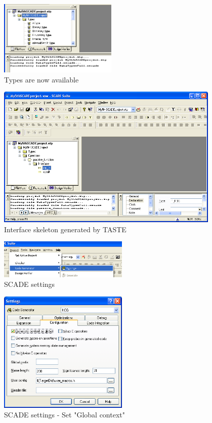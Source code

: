 \documentclass[11pt]{book}
\begin{document}
\begin{figure}
\centering
\includegraphics[width=0.5\textwidth]{imgs/scade5}
\caption{Types are now available}
\label{scade5}
\end{figure}
\begin{figure}
\centering
\includegraphics[width=0.95\textwidth]{imgs/scade6}
\caption{Interface skeleton generated by TASTE}
\label{scade6}
\end{figure}
\begin{figure}
\centering
\includegraphics[width=0.55\textwidth]{imgs/scade7}
\caption{SCADE settings}
\label{scade7}
\end{figure}
\begin{figure}
\centering
\includegraphics[width=0.55\textwidth]{imgs/scade8}
\caption{SCADE settings - Set "Global context"}
\label{scade8}
\end{figure}
\end{document}
